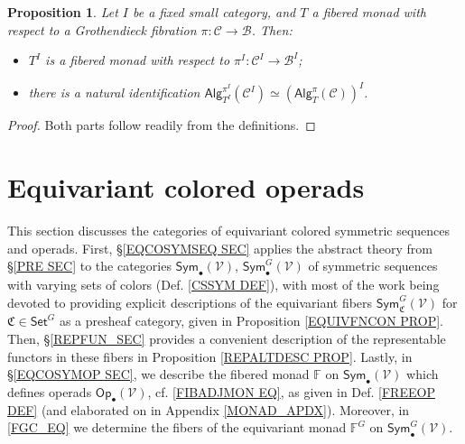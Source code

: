 \documentclass[a4paper,10pt
,draft
]{article}%
\numberwithin{equation}{section}
\numberwithin{figure}{section}
\newtheorem{proposition}[equation]{Proposition}%
\theoremstyle{definition} %
\newcommand{\Sym}{\ensuremath{\mathsf{Sym}}}%
\newcommand{\V}{\ensuremath{\mathcal V}}
\newcommand{\1}{\ensuremath{\mathbbm 1}}%
\begin{document}
\begin{proposition}\label{DIAGRAMFM_PROP}
	Let $I$ be a fixed small category, and $T$ a fibered monad with respect to a Grothendieck fibration 
	$\pi \colon \mathcal{C} \to \mathcal{B}$. Then:
	\begin{itemize}
		\item[(i)] $T^I$ is a fibered monad with respect to $\pi^I\colon \mathcal{C}^I \to \mathcal{B}^I$;
		\item[(ii)] there is a natural identification 
		$\mathsf{Alg}_{T^I}^{\pi^I}(\mathcal{C}^I)
		\simeq
		\left(\mathsf{Alg}_T^{\pi}(\mathcal{C})\right)^I$.
	\end{itemize}
\end{proposition}

\begin{proof}
	Both parts follow readily from the definitions.
\end{proof}





\section{Equivariant colored operads}
\label{ECO_SEC}

This section discusses the categories of equivariant colored symmetric sequences and operads.
First, \S \ref{EQCOSYMSEQ SEC} applies the abstract theory from \S \ref{PRE SEC}
to the categories
$\mathsf{Sym}_{\bullet}(\V)$,
$\mathsf{Sym}^G_{\bullet}(\V)$
of symmetric sequences with varying sets of colors (Def. \ref{CSSYM DEF}), 
with most of the work being devoted to providing 
explicit descriptions of the equivariant fibers
$\mathsf{Sym}^G_{\mathfrak{C}}(\V)$
for $\mathfrak{C} \in \mathsf{Set}^G$
as a presheaf category,
given in Proposition \ref{EQUIVFNCON PROP}. 
Then, \S \ref{REPFUN_SEC} provides a convenient description of the representable functors in these fibers in Proposition \ref{REPALTDESC PROP}.
%
Lastly, in \S \ref{EQCOSYMOP SEC}, 
we describe the fibered monad $\mathbb F$ on $\Sym_\bullet(\V)$
which defines operads $\mathsf{Op}_\bullet(\V)$,
cf. \eqref{FIBADJMON EQ},
as given in Def. \ref{FREEOP DEF} (and elaborated on in Appendix \ref{MONAD_APDX}). Moreover, 
in \eqref{FGC_EQ}
we determine the fibers of the equivariant monad $\mathbb F^G$ on $\Sym_\bullet^G(\V)$.
\end{document}
